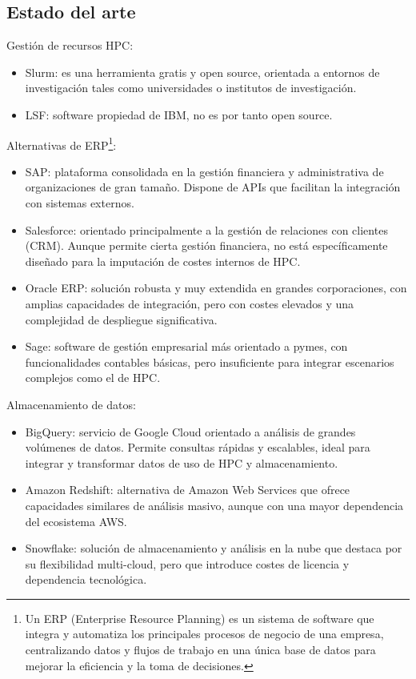 \subsection{Estado del arte}
Gestión de recursos HPC:
\begin{itemize}
    \item Slurm: es una herramienta gratis y open source, orientada a entornos de investigación tales como universidades o institutos de investigación.
    \item LSF: software propiedad de IBM, no es por tanto open source.
\end{itemize}

Alternativas de ERP\footnote{Un ERP (Enterprise Resource Planning) es un sistema de software que integra y automatiza 
los principales procesos de negocio de una empresa, centralizando datos y flujos de trabajo en una única base de datos 
para mejorar la eficiencia y la toma de decisiones.}:
\begin{itemize}
    \item SAP: plataforma consolidada en la gestión financiera y administrativa de organizaciones de gran tamaño. Dispone de APIs que facilitan la integración con sistemas externos.
    \item Salesforce: orientado principalmente a la gestión de relaciones con clientes (CRM). Aunque permite cierta gestión financiera, no está específicamente diseñado para la imputación de costes internos de HPC.
    \item Oracle ERP: solución robusta y muy extendida en grandes corporaciones, con amplias capacidades de integración, pero con costes elevados y una complejidad de despliegue significativa.
    \item Sage: software de gestión empresarial más orientado a pymes, con funcionalidades contables básicas, pero insuficiente para integrar escenarios complejos como el de HPC.

\end{itemize}

Almacenamiento de datos:
\begin{itemize}
    \item BigQuery: servicio de Google Cloud orientado a análisis de grandes volúmenes de datos. Permite consultas rápidas y escalables, ideal para integrar y transformar datos de uso de HPC y almacenamiento.
    \item Amazon Redshift: alternativa de Amazon Web Services que ofrece capacidades similares de análisis masivo, aunque con una mayor dependencia del ecosistema AWS.
    \item Snowflake: solución de almacenamiento y análisis en la nube que destaca por su flexibilidad multi-cloud, pero que introduce costes de licencia y dependencia tecnológica.

\end{itemize}